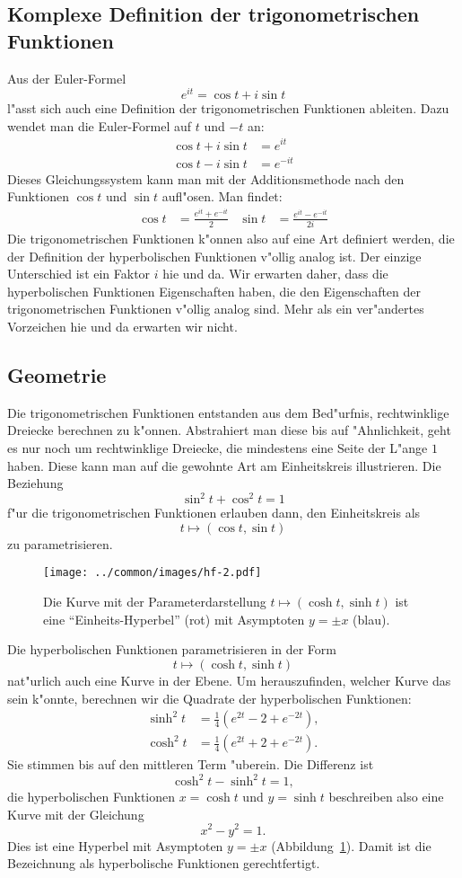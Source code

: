 \subsection{Komplexe Definition der trigonometrischen Funktionen}
Aus der Euler-Formel
\[
e^{it}=\cos t+i\sin t
\]
l"asst sich auch eine Definition der trigonometrischen Funktionen
ableiten. Dazu wendet man die Euler-Formel auf $t$ und $-t$ an:
\begin{align*}
\cos t+i\sin t&=e^{it}\\
\cos t-i\sin t&=e^{-it}
\end{align*}
Dieses Gleichungssystem kann man mit der Additionsmethode nach den
Funktionen $\cos t$ und $\sin t$ aufl"osen. Man findet:
\begin{align*}
\cos t
&=
\frac{e^{it}+e^{-it}}2
&
\sin t
&=
\frac{e^{it}-e^{-it}}{2i}
\end{align*}
Die trigonometrischen Funktionen k"onnen also auf eine Art definiert werden,
die der Definition der hyperbolischen Funktionen v"ollig analog ist.
Der einzige Unterschied ist ein Faktor $i$ hie und da.
Wir erwarten daher, dass die hyperbolischen Funktionen Eigenschaften
haben, die den Eigenschaften der trigonometrischen Funktionen v"ollig
analog sind.
Mehr als ein ver"andertes Vorzeichen hie und da erwarten wir nicht.


\subsection{Geometrie}
Die trigonometrischen Funktionen entstanden aus dem Bed"urfnis, 
rechtwinklige Dreiecke berechnen zu k"onnen.
Abstrahiert man diese bis auf "Ahnlichkeit, geht es nur noch um rechtwinklige
Dreiecke, die mindestens eine Seite der L"ange $1$ haben.
Diese kann man auf die gewohnte Art am Einheitskreis illustrieren.
Die Beziehung 
\[
\sin^2t+\cos^2t=1
\]
f"ur die trigonometrischen Funktionen erlauben dann, den Einheitskreis als
\[
t\mapsto (\cos t,\sin t)
\]
zu parametrisieren.

\begin{figure}
\centering
\texttt{[image: ../common/images/hf-2.pdf]}
\caption{Die Kurve mit der Parameterdarstellung
$t\mapsto (\cosh t, \sinh t)$ ist eine ``Einheits-Hyperbel'' (rot) mit 
Asymptoten $y=\pm x$ (blau).
\label{anhang:hyperbel}}
\end{figure}
Die hyperbolischen Funktionen parametrisieren in der Form
\[
t\mapsto (\cosh t, \sinh t)
\]
nat"urlich auch eine Kurve in der Ebene.
Um herauszufinden, welcher Kurve das sein k"onnte, berechnen wir die 
Quadrate der hyperbolischen Funktionen:
\begin{align}
\sinh^2 t&=\frac14(e^{2t}-2+e^{-2t}),
\\
\cosh^2 t&=\frac14(e^{2t}+2+e^{-2t}).
\label{hyp:definition}
\end{align}
Sie stimmen bis auf den mittleren Term "uberein.
Die Differenz ist 
\[
\cosh^2t - \sinh^2t=1,
\]
die hyperbolischen Funktionen $x=\cosh t$ und $y=\sinh t$
beschreiben also eine Kurve mit der Gleichung
\[
x^2-y^2=1.
\]
Dies ist eine Hyperbel mit Asymptoten $y=\pm x$
(Abbildung~\ref{anhang:hyperbel}).
Damit ist die Bezeichnung als hyperbolische Funktionen gerechtfertigt.

